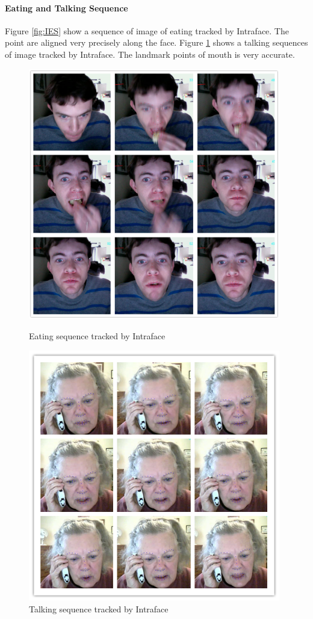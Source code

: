 \paragraph{Eating and Talking Sequence}
Figure \ref{fig:IES} show a sequence of image of eating tracked by Intraface. The point are aligned very precisely along the face. Figure \ref{fig:ITS} shows a talking sequences of image tracked by Intraface. The landmark points of mouth is very accurate.
\begin{figure}[p]
\centering
\includegraphics[width=110mm]{imgs/Tracking_Intraface_eating_red.png}
\caption{Eating sequence tracked by Intraface}
\label{fig:IES}
\includegraphics[width=110mm]{imgs/Talking_Intraface_140711_176_184.png}
\caption{Talking sequence tracked by Intraface}
\label{fig:ITS}
\end{figure}
\newpage
